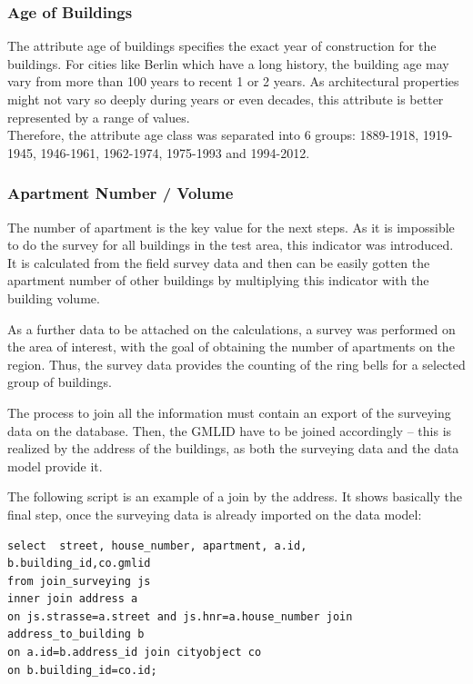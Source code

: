 \documentclass[11pt]{article}
\begin{document}
\subsubsection{Age of Buildings}

The attribute age of buildings specifies the exact year of construction for the buildings. For cities like Berlin which have a long history, the building age may vary from more than 100 years to recent 1 or 2 years. As architectural properties might not vary so deeply during years or even decades, this attribute is better represented by a range of values. \\

Therefore, the attribute age class was separated into 6 groups: 1889-1918, 1919-1945, 1946-1961, 1962-1974, 1975-1993 and 1994-2012.\\
\subsubsection{Apartment Number / Volume}
The number of apartment is the key value for the next steps. As it is impossible to do the survey for all buildings in the test area, this indicator was introduced. It is calculated from the field survey data and then can be easily gotten the apartment number of other buildings by multiplying this indicator with the building volume.

As a further data to be attached on the calculations, a survey was performed on the area of interest, with the goal of obtaining the number of apartments on the region. Thus, the survey data provides the counting of the ring bells for a selected group of buildings.

The process to join all the information must contain an export of the surveying data on the database. Then, the GMLID have to be joined accordingly – this is realized by the address of the buildings, as both the surveying data and the data model provide it. 

The following script is an example of a join by the address. It shows basically the final step, once the surveying data is already imported on the data model:
\begin{lstlisting}
select  street, house_number, apartment, a.id,
b.building_id,co.gmlid
from join_surveying js
inner join address a
on js.strasse=a.street and js.hnr=a.house_number join
address_to_building b
on a.id=b.address_id join cityobject co
on b.building_id=co.id;
\end{lstlisting}
\end{document}
